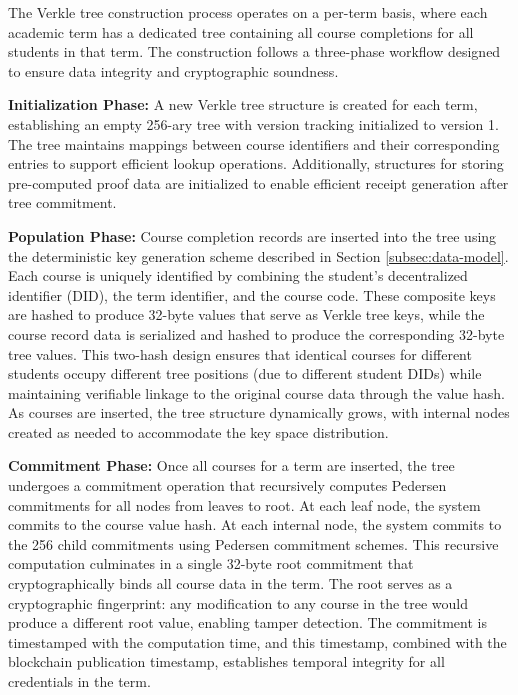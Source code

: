 The Verkle tree construction process operates on a per-term basis, where each academic term has a dedicated tree containing all course completions for all students in that term. The construction follows a three-phase workflow designed to ensure data integrity and cryptographic soundness.

\textbf{Initialization Phase:} A new Verkle tree structure is created for each term, establishing an empty 256-ary tree with version tracking initialized to version 1. The tree maintains mappings between course identifiers and their corresponding entries to support efficient lookup operations. Additionally, structures for storing pre-computed proof data are initialized to enable efficient receipt generation after tree commitment.

\textbf{Population Phase:} Course completion records are inserted into the tree using the deterministic key generation scheme described in Section \ref{subsec:data-model}. Each course is uniquely identified by combining the student's decentralized identifier (DID), the term identifier, and the course code. These composite keys are hashed to produce 32-byte values that serve as Verkle tree keys, while the course record data is serialized and hashed to produce the corresponding 32-byte tree values. This two-hash design ensures that identical courses for different students occupy different tree positions (due to different student DIDs) while maintaining verifiable linkage to the original course data through the value hash. As courses are inserted, the tree structure dynamically grows, with internal nodes created as needed to accommodate the key space distribution.

\textbf{Commitment Phase:} Once all courses for a term are inserted, the tree undergoes a commitment operation that recursively computes Pedersen commitments for all nodes from leaves to root. At each leaf node, the system commits to the course value hash. At each internal node, the system commits to the 256 child commitments using Pedersen commitment schemes. This recursive computation culminates in a single 32-byte root commitment that cryptographically binds all course data in the term. The root serves as a cryptographic fingerprint: any modification to any course in the tree would produce a different root value, enabling tamper detection. The commitment is timestamped with the computation time, and this timestamp, combined with the blockchain publication timestamp, establishes temporal integrity for all credentials in the term.

